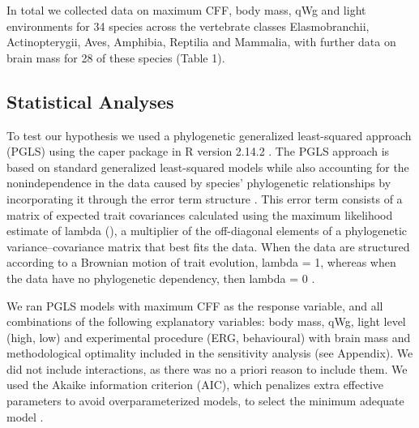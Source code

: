 In total we collected data on maximum CFF, body mass, qWg and light environments for 34 species across the vertebrate classes Elasmobranchii, Actinopterygii, Aves, Amphibia, Reptilia and Mammalia, with further data on brain mass for 28 of these species (Table 1).

\subsection{Statistical Analyses}
To test our hypothesis we used a phylogenetic generalized least-squared approach (PGLS) using the caper package \citep{orme2011caper} in R version 2.14.2 \citep{RCran}. The PGLS approach is based on standard generalized least-squared models while also accounting for the nonindependence in the data caused by species' phylogenetic relationships by incorporating it through the error term structure \citep{pagel1999inferring,rohlf2001comparative}. This error term consists of a matrix of expected trait covariances calculated using the maximum likelihood estimate of lambda (), a multiplier of the off-diagonal elements of a phylogenetic variance–covariance matrix that best fits the data. When the data are structured according to a Brownian motion of trait evolution, lambda = 1, whereas when the data have no phylogenetic dependency, then lambda = 0 \citep{pagel1999inferring}.

We ran PGLS models with maximum CFF as the response variable, and all combinations of the following explanatory variables: body mass, qWg, light level (high, low) and experimental procedure (ERG, behavioural) with brain mass and methodological optimality included in the sensitivity analysis (see Appendix). We did not include interactions, as there was no a priori reason to include them. We used the Akaike information criterion (AIC), which penalizes extra effective parameters to avoid overparameterized models, to select the minimum adequate model \citep{burnham2002model}.


